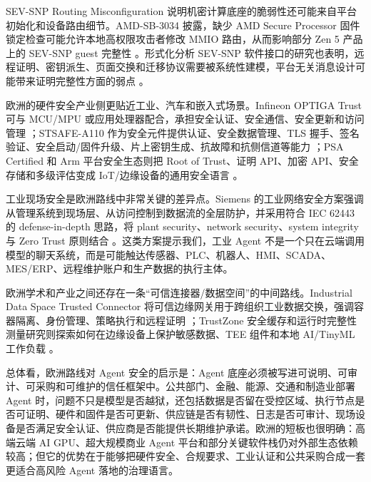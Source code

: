 SEV-SNP Routing Misconfiguration 说明机密计算底座的脆弱性还可能来自平台初始化和设备路由细节。AMD-SB-3034 披露，缺少 AMD Secure Processor 固件锁定检查可能允许本地高权限攻击者修改 MMIO 路由，从而影响部分 Zen 5 产品上的 SEV-SNP guest 完整性 \cite{amdsb3034}。形式化分析 SEV-SNP 软件接口的研究也表明，远程证明、密钥派生、页面交换和迁移协议需要被系统性建模，平台无关消息设计可能带来证明完整性方面的弱点 \cite{formalsevsnp2024}。

欧洲的硬件安全产业侧更贴近工业、汽车和嵌入式场景。Infineon OPTIGA Trust 可与 MCU/MPU 或应用处理器配合，承担安全认证、安全通信、安全更新和访问管理 \cite{infineonoptiga2026}；STSAFE-A110 作为安全元件提供认证、安全数据管理、TLS 握手、签名验证、安全启动/固件升级、片上密钥生成、抗故障和抗侧信道等能力 \cite{stsafea1102026}；PSA Certified 和 Arm 平台安全生态则把 Root of Trust、证明 API、加密 API、安全存储和多级评估变成 IoT/边缘设备的通用安全语言 \cite{psacertified2026,armplatformsecurity2026}。

工业现场安全是欧洲路线中非常关键的差异点。Siemens 的工业网络安全方案强调从管理系统到现场层、从访问控制到数据流的全层防护，并采用符合 IEC 62443 的 defense-in-depth 思路，将 plant security、network security、system integrity 与 Zero Trust 原则结合 \cite{siemensindustrialcyber2026}。这类方案提示我们，工业 Agent 不是一个只在云端调用模型的聊天系统，而是可能触达传感器、PLC、机器人、HMI、SCADA、MES/ERP、远程维护账户和生产数据的执行主体。

欧洲学术和产业之间还存在一条“可信连接器/数据空间”的中间路线。Industrial Data Space Trusted Connector 将可信边缘网关用于跨组织工业数据交换，强调容器隔离、身份管理、策略执行和远程证明 \cite{trustedconnector2018}；TrustZone 安全缓存和运行时完整性测量研究则探索如何在边缘设备上保护敏感数据、TEE 组件和本地 AI/TinyML 工作负载 \cite{kevlartz2021,pdrima2025}。

总体看，欧洲路线对 Agent 安全的启示是：Agent 底座必须被写进可说明、可审计、可采购和可维护的信任框架中。公共部门、金融、能源、交通和制造业部署 Agent 时，问题不只是模型是否越狱，还包括数据是否留在受控区域、执行节点是否可证明、硬件和固件是否可更新、供应链是否有韧性、日志是否可审计、现场设备是否满足安全认证、供应商是否能提供长期维护承诺。欧洲的短板也很明确：高端云端 AI GPU、超大规模商业 Agent 平台和部分关键软件栈仍对外部生态依赖较高；但它的优势在于能够把硬件安全、合规要求、工业认证和公共采购合成一套更适合高风险 Agent 落地的治理语言。

